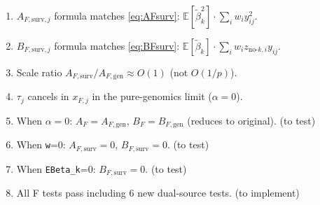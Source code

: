 \documentclass[11pt]{article}
\newcommand{\E}{\mathbb{E}}
\begin{document}
\begin{verifybox}[D2 Verification]
\begin{enumerate}
  \item $A_{F,\text{surv},j}$ formula matches \eqref{eq:AFsurv}: $\E[\tilde\beta_k^2]\cdot\sum_i w_i y_{ij}^2$. \checkmark
  \item $B_{F,\text{surv},j}$ formula matches \eqref{eq:BFsurv}: $\E[\tilde\beta_k]\cdot\sum_i w_i z_{\text{no-}k,i} y_{ij}$. \checkmark
  \item Scale ratio $A_{F,\text{surv}}/A_{F,\text{gen}} \approx O(1)$ (not $O(1/p)$). \checkmark
  \item $\tau_j$ cancels in $x_{F,j}$ in the pure-genomics limit ($\alpha=0$). \checkmark
  \item When $\alpha=0$: $A_F = A_{F,\text{gen}}$, $B_F = B_{F,\text{gen}}$ (reduces to original). (to test)
  \item When \texttt{w}=0: $A_{F,\text{surv}}=0$, $B_{F,\text{surv}}=0$. (to test)
  \item When \texttt{EBeta\_k}=0: $B_{F,\text{surv}}=0$. (to test)
  \item All F tests pass including 6 new dual-source tests. (to implement)
\end{enumerate}
\end{verifybox}
\end{document}
